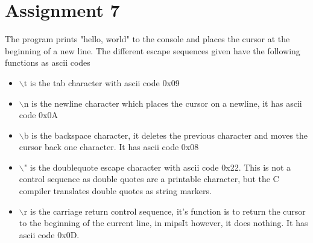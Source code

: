 \section{Assignment 7}
The program prints "hello, world" to the console and places the cursor at the beginning of a new line.
The different escape sequences given have the following functions as ascii codes
\begin{itemize}
\item \(\backslash\)t is the tab character with ascii code 0x09
\item \(\backslash\)n is the newline character which places the cursor on a newline, it has ascii code 0x0A
\item \(\backslash\)b is the backspace character, it deletes the previous character and moves the cursor back one character. It has
ascii code 0x08
\item \(\backslash\)" is the doublequote escape character with ascii code 0x22. This is not a control sequence as double quotes are 
a printable character, but the C compiler translates double quotes as string markers.
\item \(\backslash\)r is the carriage return control sequence, it's function is to return the cursor to the beginning of the 
current line, in mipsIt however, it does nothing. It has ascii code 0x0D.
\end{itemize}
